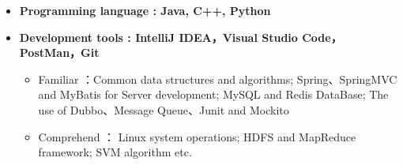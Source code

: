   \begin{itemize}[leftmargin=*]
    \item \textbf{Programming language : Java, C++, Python}
    \item \textbf{Development tools : IntelliJ IDEA，Visual Studio Code，PostMan，Git}
    {\small
      \begin{itemize}
        \item{Familiar ：Common data structures and algorithms;
              Spring、SpringMVC and MyBatis for Server development;
              MySQL and Redis DataBase;
              The use of Dubbo、Message Queue、Junit and Mockito
              }
        \item{Comprehend ： Linux system operations;
              HDFS and MapReduce framework;
              SVM algorithm etc.
              }
      \end{itemize}
      }
  \end{itemize}